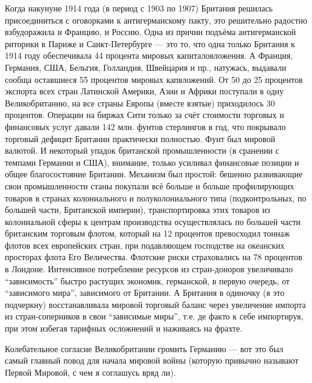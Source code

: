 Когда накунуне 1914 года (в период с 1903 по 1907) Британия решилась
присоединиться с оговорками к антигерманскому пакту, это решительно радостно
взбудоражила и Францию, и Россию. Одна из причин подъёма антигерманской риторики
в Париже и Санкт-Петербурге --- это то, что одна только Британия к 1914 году
обеспечивала 44 процента мировых капиталовложения. А Франция, Германия, США,
Бельгия, Голландия, Швейцария и пр., натужась, выдавали сообща оставшиеся 55
процентов мировых капвложений. От 50 до 25 процентов экспорта всех стран
Латинской Америки, Азии и Африки поступали в одну  Великобританию, на все страны
Европы (вместе взятые) приходилось 30 процентов. Операции на биржах Сити только
за счёт стоимости торговых и финансовых услуг давали 142 млн. фунтов стерлингов
в год, что покрывало торговый дефицит Британии практически полностью. Фунт был
мировой валютой. И некоторый упадок британской промышленности (в сранении с
темпами Германии и США), внимание, только усиливал финансовые позиции и общее
благосостояние Британии. Механизм был простой: бешенно развивающие свои
промышленности станы покупали всё больше и больше профилирующих товаров в
странах колониального и полуколониального типа (подконтрольных, по большей
части, Британской империи), транспортировка этих товаров из колониальной сферы
к центрам производства осуществлялась по большей части британским торговым
флотом, который на 12 процентов превосходил тоннаж флотов всех европейских
стран, при подавляющем господстве на океанских просторах флота Его Величества.
Флотские риски страховались на 78 процентов в Лондоне. Интенсивное потребление
ресурсов из стран-доноров увеличивало \enquote{зависимость} быстро растущих экономик,
германской, в первую очередь, от \enquote{зависимого мира}, зависимого от Британии.
А Британия в одиночку (я это подчеркну) восстанавливала мировой торговый баланс
через увеличение импорта из стран-соперников в свои \enquote{зависимые миры}, т.е. де
факто к себе импортируя, при этом избегая тарифных осложнений и наживаясь на
фрахте.

Колебательное согласие Великобритании громить Германию --- вот это был самый
главный повод для начала мировой войны (которую привычно называют Первой
Мировой, с чем я соглашусь вряд ли).
